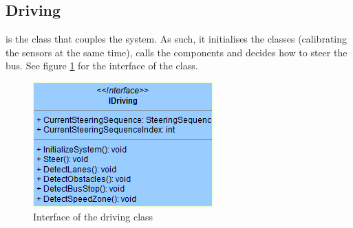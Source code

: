 
\subsection{Driving}
 is the class that couples the system. As such, it initialises the classes (calibrating the sensors at the same time), calls the components and decides how to steer the bus. See figure \ref{fig:interfaceDriving} for the interface of the  class.

\begin{figure}[ht]
    \includegraphics[]{Images/Design/interfaceDriving.png}
    \caption{Interface of the driving class}
    \label{fig:interfaceDriving}
\end{figure}



